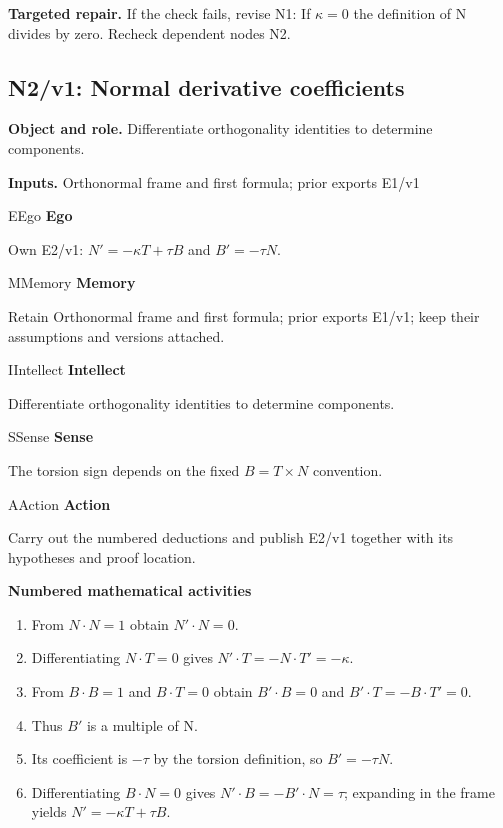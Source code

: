 \documentclass[preprint,12pt,aps,pra,showkeys,amsmath,amssymb,superscriptaddress,floatfix]{revtex4-2}
\theoremstyle{definition}
\theoremstyle{remark}
\newcommand{\mmfaculty}[3]{%
 \begin{mmfacultybox}{#1}{#2}
 {\sffamily\bfseries\color{MMBlue}#2}\par\smallskip #3
 \end{mmfacultybox}}
\newcommand{\field}[2]{\par\smallskip\noindent\textbf{#1.} #2\par}
\begin{document}
\field{Targeted repair}{If the check fails, revise N1: If \(\kappa =0\) the definition of N
divides by zero. Recheck dependent nodes N2.}

\clearpage

\subsection{N2/v1: Normal derivative coefficients}

\field{Object and role}{Differentiate orthogonality identities to determine components.}

\field{Inputs}{Orthonormal frame and first formula; prior exports E1/v1}

\mmfaculty{E}{Ego}{Own E2/v1: \(N'=-\kappa T+\tau B\) and \(B'=-\tau N\).}

\mmfaculty{M}{Memory}{Retain Orthonormal frame and first formula; prior exports E1/v1; keep
their assumptions and versions attached.}

\mmfaculty{I}{Intellect}{Differentiate orthogonality identities to determine components.}

\mmfaculty{S}{Sense}{The torsion sign depends on the fixed \(B=T\times N\) convention.}

\mmfaculty{A}{Action}{Carry out the numbered deductions and publish E2/v1 together with its
hypotheses and proof location.}

\smallskip\noindent\textbf{Numbered mathematical activities}

\begin{enumerate}[label=N2.\arabic*,leftmargin=3.4em]

\item From \(N\cdot N=1\) obtain \(N'\cdot N=0\).

\item Differentiating \(N\cdot T=0\) gives \(N'\cdot T=-N\cdot T'=-\kappa\).

\item From \(B\cdot B=1\) and \(B\cdot T=0\) obtain \(B'\cdot B=0\) and
\(B'\cdot T=-B\cdot T'=0\).

\item Thus \(B'\) is a multiple of N.

\item Its coefficient is \(-\tau\) by the torsion definition, so
\(B'=-\tau N\).

\item Differentiating \(B\cdot N=0\) gives \(N'\cdot B=-B'\cdot N=\tau\);
expanding in the frame yields \(N'=-\kappa T+\tau B\).

\end{enumerate}
\end{document}

